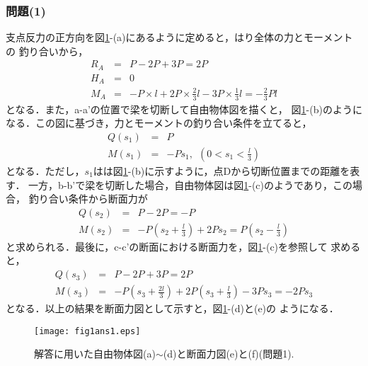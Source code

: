 \documentclass[10pt,a4j]{jarticle}
\begin{document}
\subsubsection*{問題(1)}
支点反力の正方向を図\ref{fig:fig1_1}-(a)にあるように定めると，はり全体の力とモーメントの
釣り合いから，
\begin{eqnarray}
	R_A &=& P-2P+3P=2P \\
	H_A &=&0 \\
	M_A &=& -P\times l + 2P\times \frac{2}{3}l -3P\times \frac{1}{3}l=-\frac{2}{3}Pl
	\label{eqn:Rs_simple}
\end{eqnarray}
となる．また，a-a'の位置で梁を切断して自由物体図を描くと，
図\ref{fig:fig1_1}-(b)のようになる．この図に基づき，力とモーメントの釣り合い条件を立てると，
\begin{eqnarray}
	Q(s_1) &=& P \\
	M(s_1) &=& -Ps_1, \ \ \left(0<s_1 < \frac{l}{3}\right)
	\label{eqn:eqlbl}
\end{eqnarray}
となる．ただし，$s_1$はは図\ref{fig:fig1_1}-(b)に示すように，点Dから切断位置までの距離を表す．
一方，b-b'で梁を切断した場合，自由物体図は図\ref{fig:fig1_1}-(c)のようであり，この場合，
釣り合い条件から断面力が
\begin{eqnarray}
	Q(s_2) &=& P-2P=-P \\ 
	M(s_2) &=& -P\left(s_2+\frac{l}{3}\right) +2Ps_2 = P \left( s_2-\frac{l}{3}\right)
	\label{eqn:eqlbl}
\end{eqnarray}
と求められる．最後に，c-c'の断面における断面力を，図\ref{fig:fig1_1}-(c)を参照して
求めると，
\begin{eqnarray}
	Q(s_3) &=&P-2P+3P=2P \\ 
	M(s_3) &=&-P\left(s_3+\frac{2l}{3}\right) +2P\left(s_3+\frac{l}{3}\right) -3P s_3
	=-2Ps_3 
	\label{eqn:eqlbl}
\end{eqnarray}
となる．以上の結果を断面力図として示すと，図\ref{fig:fig1_1}-(d)と(e)の
ようになる．
\begin{figure}[h]
	\begin{center}
	\texttt{[image: fig1ans1.eps]} 
	\end{center}
	\caption{解答に用いた自由物体図(a)$\sim$(d)と断面力図(e)と(f)(問題1).} 
	\label{fig:fig1_1}
\end{figure}
\end{document}
